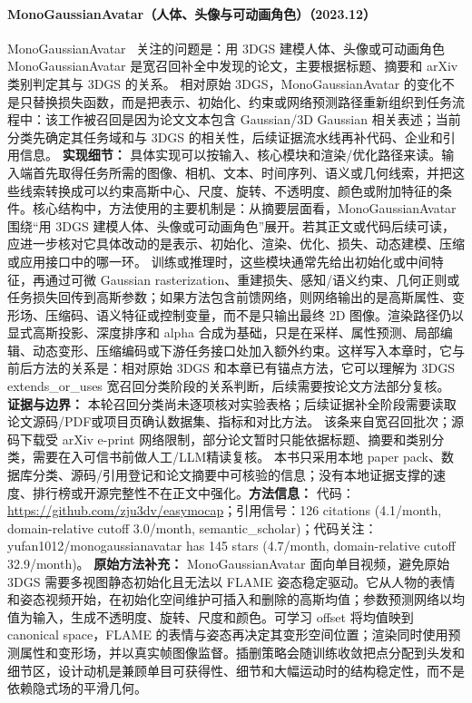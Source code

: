 \paragraph{MonoGaussianAvatar（人体、头像与可动画角色）（2023.12）}
MonoGaussianAvatar~\cite{2312_04558} 关注的问题是：用 3DGS 建模人体、头像或可动画角色 MonoGaussianAvatar 是宽召回补全中发现的论文，主要根据标题、摘要和 arXiv 类别判定其与 3DGS 的关系。
相对原始 3DGS，MonoGaussianAvatar 的变化不是只替换损失函数，而是把表示、初始化、约束或网络预测路径重新组织到任务流程中：该工作被召回是因为论文文本包含 Gaussian/3D Gaussian 相关表述；当前分类先确定其任务域和与 3DGS 的相关性，后续证据流水线再补代码、企业和引用信息。
\textbf{实现细节：} 具体实现可以按输入、核心模块和渲染/优化路径来读。输入端首先取得任务所需的图像、相机、文本、时间序列、语义或几何线索，并把这些线索转换成可以约束高斯中心、尺度、旋转、不透明度、颜色或附加特征的条件。核心结构中，方法使用的主要机制是：从摘要层面看，MonoGaussianAvatar 围绕“用 3DGS 建模人体、头像或可动画角色”展开。若其正文或代码后续可读，应进一步核对它具体改动的是表示、初始化、渲染、优化、损失、动态建模、压缩或应用接口中的哪一环。 训练或推理时，这些模块通常先给出初始化或中间特征，再通过可微 Gaussian rasterization、重建损失、感知/语义约束、几何正则或任务损失回传到高斯参数；如果方法包含前馈网络，则网络输出的是高斯属性、变形场、压缩码、语义特征或控制变量，而不是只输出最终 2D 图像。渲染路径仍以显式高斯投影、深度排序和 alpha 合成为基础，只是在采样、属性预测、局部编辑、动态变形、压缩编码或下游任务接口处加入额外约束。这样写入本章时，它与前后方法的关系是：相对原始 3DGS 和本章已有锚点方法，它可以理解为 3DGS extends\_or\_uses 宽召回分类阶段的关系判断，后续需要按论文方法部分复核。
\textbf{证据与边界：} 本轮召回分类尚未逐项核对实验表格；后续证据补全阶段需要读取论文源码/PDF或项目页确认数据集、指标和对比方法。 该条来自宽召回批次；源码下载受 arXiv e-print 网络限制，部分论文暂时只能依据标题、摘要和类别分类，需要在入可信书前做人工/LLM精读复核。 本书只采用本地 paper pack、数据库分类、源码/引用登记和论文摘要中可核验的信息；没有本地证据支撑的速度、排行榜或开源完整性不在正文中强化。\textbf{方法信息：} 代码：\url{https://github.com/zju3dv/easymocap}；引用信号：126 citations (4.1/month, domain-relative cutoff 3.0/month, semantic\_scholar)；代码关注：yufan1012/monogaussianavatar has 145 stars (4.7/month, domain-relative cutoff 32.9/month)。
\textbf{原始方法补充：} MonoGaussianAvatar 面向单目视频，避免原始 3DGS 需要多视图静态初始化且无法以 FLAME 姿态稳定驱动。它从人物的表情和姿态视频开始，在初始化空间维护可插入和删除的高斯均值；参数预测网络以均值为输入，生成不透明度、旋转、尺度和颜色。可学习 offset 将均值映到 canonical space，FLAME 的表情与姿态再决定其变形空间位置；渲染同时使用预测属性和变形场，并以真实帧图像监督。插删策略会随训练收敛把点分配到头发和细节区，设计动机是兼顾单目可获得性、细节和大幅运动时的结构稳定性，而不是依赖隐式场的平滑几何。
